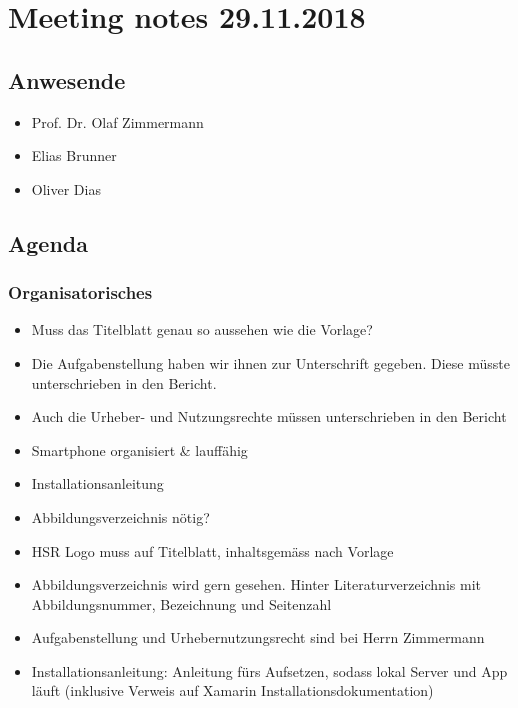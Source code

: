 \hypertarget{meeting-notes-29112018}{%
\section*{Meeting notes 29.11.2018}\label{meeting-notes-29112018}}

\hypertarget{anwesende}{%
\subsection*{Anwesende}\label{anwesende}}

\begin{itemize}

\item
  Prof. Dr. Olaf Zimmermann
\item
  Elias Brunner
\item
  Oliver Dias
\end{itemize}

\hypertarget{agenda}{%
\subsection*{Agenda}\label{agenda}}

\hypertarget{organisatorisches}{%
\subsubsection*{Organisatorisches}\label{organisatorisches}}

\begin{itemize}
\item
  Muss das Titelblatt genau so aussehen wie die Vorlage?
\item
  Die Aufgabenstellung haben wir ihnen zur Unterschrift gegeben. Diese
  müsste unterschrieben in den Bericht.
\item
  Auch die Urheber- und Nutzungsrechte müssen unterschrieben in den
  Bericht
\item
  Smartphone organisiert \& lauffähig
\item
  Installationsanleitung
\item
  Abbildungsverzeichnis nötig?
\item
  HSR Logo muss auf Titelblatt, inhaltsgemäss nach Vorlage
\item
  Abbildungsverzeichnis wird gern gesehen. Hinter Literaturverzeichnis
  mit Abbildungsnummer, Bezeichnung und Seitenzahl
\item
  Aufgabenstellung und Urhebernutzungsrecht sind bei Herrn Zimmermann
\item
  Installationsanleitung: Anleitung fürs Aufsetzen, sodass lokal Server
  und App läuft (inklusive Verweis auf Xamarin
  Installationsdokumentation)
\end{itemize}

